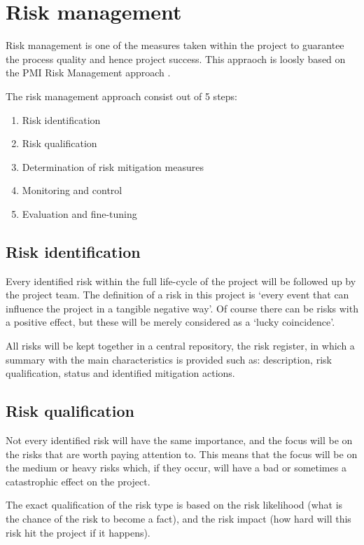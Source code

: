 \section{Risk management}
\label{sec:risk-management}
Risk management is one of the measures taken within the project to guarantee the process quality and hence project success.
This appraoch is loosly based on the PMI Risk Management approach  \cite{pmi}.

The risk management approach consist out of 5 steps:

\begin{enumerate}
    \item Risk identification 
    \item Risk qualification
    \item Determination of risk mitigation measures
    \item Monitoring and control
    \item Evaluation and fine-tuning
\end {enumerate}
\subsection{Risk identification}
Every identified risk within the full life-cycle of the project will be followed up by the project team.
The definition of a risk in this project is  `every event that can influence the project in a tangible negative way'.
Of course there can be risks with a positive effect, but these will be merely considered as a `lucky coincidence'.

All risks will be kept together in a central repository, the risk register, in which a summary with the main characteristics is provided such as: description, risk qualification, status and identified mitigation actions.

\subsection{Risk qualification}
Not every identified risk will have the same importance, and the focus will be on the risks that are worth paying attention to.
This means that the focus will be on the medium or heavy risks which, if they occur, will have a bad or sometimes a catastrophic effect on the project.

The exact qualification of the risk type is based on the risk likelihood (what is the chance of the risk to become a fact), and the risk impact (how hard will this risk hit the project if it happens).

